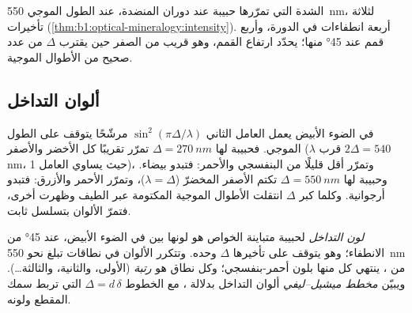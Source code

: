 \begin{omfigure}

{\small الشدة التي تمرّرها حبيبة عند دوران المنضدة، عند الطول الموجي \qty{550}{nm}، لثلاثة تأخيرات (\cref{thm:b1:optical-mineralogy:intensity}). أربعة انطفاءات في الدورة، وأربع قمم عند \ang{45} منها؛  يحدّد ارتفاع القمم، وهو قريب من الصفر حين يقترب $\Delta$ من عدد صحيح من الأطوال الموجية.}
\end{omfigure}

\subsection{ألوان التداخل}

في الضوء الأبيض يعمل العامل الثاني $\sin^2(\pi\Delta/\lambda)$ مرشّحًا يتوقف على الطول الموجي. فحبيبة لها $\Delta = \qty{270}{nm}$ تمرّر تقريبًا كل الأخضر والأصفر ($\lambda$ قرب $2\Delta = 540$\,nm، حيث يساوي العامل 1)، وتمرّر أقل قليلًا من البنفسجي والأحمر: فتبدو بيضاء. وحبيبة لها $\Delta = \qty{550}{nm}$ تكتم الأصفر المخضرّ ($\lambda = \Delta$)، وتمرّر الأحمر والأزرق: فتبدو أرجوانية. وكلما كبر $\Delta$ انتقلت الأطوال الموجية المكتومة عبر الطيف وظهرت أخرى، فتمرّ الألوان بتسلسل ثابت.

\begin{definition}\label{def:b1:optical-mineralogy:interference-colour}
\emph{لون التداخل} لحبيبة متباينة الخواص هو لونها بين  في الضوء الأبيض، عند \ang{45} من الانطفاء؛ وهو يتوقف على تأخيرها $\Delta$ وحده. وتتكرر الألوان في نطاقات تبلغ نحو \qty{550}{nm} من ، ينتهي كل منها بلون أحمر-بنفسجي؛ وكل نطاق هو \emph{رتبة} (الأولى، والثانية، والثالثة\dots). ويبيّن \emph{مخطط ميشيل–ليفي} ألوان التداخل بدلالة ، مع الخطوط $\Delta = d\,\delta$ التي تربط سمك المقطع   ولونه.
\end{definition}

